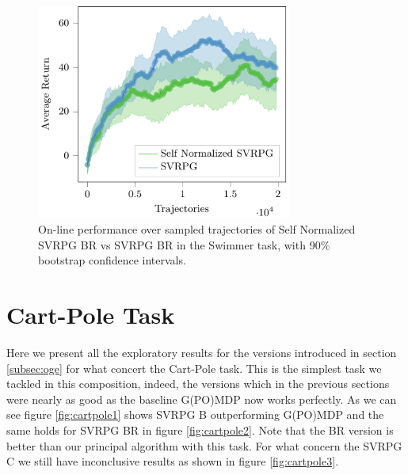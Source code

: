 \begin{figure}[h]
	\begin{minipage}[h]{1\textwidth}
		\centering
		\includegraphics[width=0.75\textwidth]{Images/Experiments/swimmer_SVRPG_vs_SN_SVRPG_B_reuse.pdf}
		\vspace{-0.1in}
		\caption{On-line performance over sampled trajectories of Self Normalized \acs{SVRPG} BR vs \acs{SVRPG} BR in the Swimmer task, with 90\% bootstrap confidence intervals.}
		\label{fig:swimmereleven}
	\end{minipage}
	\vspace{-0.15in}
\end{figure}



\clearpage
\vspace{-0.05in}
\section{Cart-Pole Task}
\vspace{-0.05in}
Here we present all the exploratory results for the versions introduced in section \ref{subsec:oge} for what concert the Cart-Pole task. This is the simplest task we tackled in this composition, indeed, the versions which in the previous sections were nearly as good as the baseline G(PO)MDP now works perfectly. As we can see figure \ref{fig:cartpole1} shows \acs{SVRPG} B outperforming G(PO)MDP and the same holds for \acs{SVRPG} BR in figure \ref{fig:cartpole2}. Note that the BR version is better than our principal algorithm with this task. For what concern the \acs{SVRPG} C we still have inconclusive results as shown in figure \ref{fig:cartpole3}.

